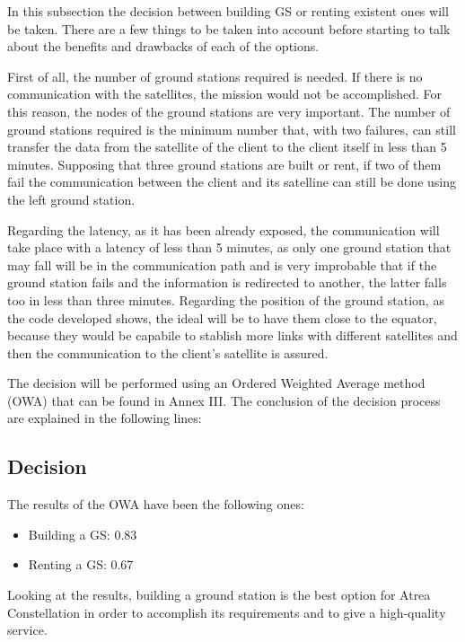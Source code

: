 In this subsection the decision between building GS or renting existent ones will be taken. There are a few things to be taken into account before starting to talk about the benefits and drawbacks of each of the options.

First of all, the number of ground stations required is needed. If there is no communication with the satellites, the mission would not be accomplished. For this reason, the nodes of the ground stations are very important. The number of ground stations required is the minimum number that, with two failures, can still transfer the data from the satellite of the client to the client itself in less than 5 minutes. Supposing that three ground stations are built or rent, if two of them fail the communication between the client and its satelline can still be done using the left ground station.

Regarding the latency, as it has been already exposed, the communication will take place with a latency of less than 5 minutes, as only one ground station that may fall will be in the communication path and is very improbable that if the ground station fails and the information is redirected to another, the latter falls too in less than three minutes. Regarding the position of the ground station, as the code developed shows, the ideal will be to have them close to the equator, because they would be capabile to stablish more links with different satellites and then the communication to the client's satellite is assured.

The decision will be performed using an Ordered Weighted Average method (OWA) that can be found in Annex III. The conclusion of the decision process are explained in the following lines:

\subsection{Decision}
The results of the OWA have been the following ones:
\begin{itemize}
\item Building a GS: 0.83
\item Renting a GS: 0.67
\end{itemize}

Looking at the results, building a ground station is the best option for Atrea Constellation in order to accomplish its requirements and to give a high-quality service.